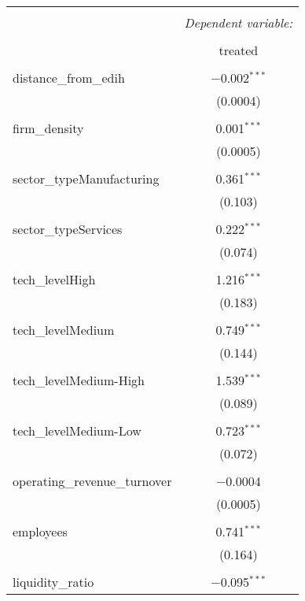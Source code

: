 
\begin{table}[!htbp] \centering 
  \caption{} 
  \label{} 
\begin{tabular}{@{\extracolsep{5pt}}lc} 
\\[-1.8ex]\hline 
\hline \\[-1.8ex] 
 & \multicolumn{1}{c}{\textit{Dependent variable:}} \\ 
\cline{2-2} 
\\[-1.8ex] & treated \\ 
\hline \\[-1.8ex] 
 distance\_from\_edih & $-$0.002$^{***}$ \\ 
  & (0.0004) \\ 
  & \\ 
 firm\_density & 0.001$^{***}$ \\ 
  & (0.0005) \\ 
  & \\ 
 sector\_typeManufacturing & 0.361$^{***}$ \\ 
  & (0.103) \\ 
  & \\ 
 sector\_typeServices & 0.222$^{***}$ \\ 
  & (0.074) \\ 
  & \\ 
 tech\_levelHigh & 1.216$^{***}$ \\ 
  & (0.183) \\ 
  & \\ 
 tech\_levelMedium & 0.749$^{***}$ \\ 
  & (0.144) \\ 
  & \\ 
 tech\_levelMedium-High & 1.539$^{***}$ \\ 
  & (0.089) \\ 
  & \\ 
 tech\_levelMedium-Low & 0.723$^{***}$ \\ 
  & (0.072) \\ 
  & \\ 
 operating\_revenue\_turnover & $-$0.0004 \\ 
  & (0.0005) \\ 
  & \\ 
 employees & 0.741$^{***}$ \\ 
  & (0.164) \\ 
  & \\ 
 liquidity\_ratio & $-$0.095$^{***}$ \\ 

\end{tabular}
\end{table}
